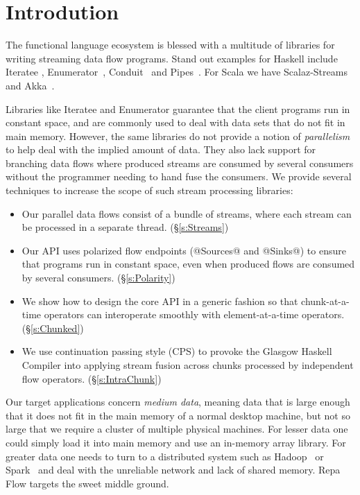 \section{Introdution}

The functional language ecosystem is blessed with a multitude of libraries for writing streaming data flow programs. Stand out examples for Haskell include Iteratee \cite{Kiselyov:iteratee}, Enumerator~\cite{hackage:enumerator}, Conduit~\cite{hackage:conduit} and Pipes~\cite{hackage:pipes}. For Scala we have Scalaz-Streams~\cite{github:scalaz-streams} and Akka~\cite{github:akka}.

Libraries like Iteratee and Enumerator guarantee that the client programs run in constant space, and are commonly used to deal with data sets that do not fit in main memory. However, the same libraries do not provide a notion of \emph{parallelism} to help deal with the implied amount of data. They also lack support for branching data flows where produced streams are consumed by several consumers without the programmer needing to hand fuse the consumers. We provide several techniques to increase the scope of such stream processing libraries:

\begin{itemize}
\item Our parallel data flows consist of a bundle of streams, where each stream can be processed in a separate thread. (\S\ref{s:Streams})

\item Our API uses polarized flow endpoints (@Sources@ and @Sinks@) to ensure that programs run in constant space, even when produced flows are consumed by several consumers. (\S\ref{s:Polarity})

\item We show how to design the core API in a generic fashion so that chunk-at-a-time operators can interoperate smoothly with element-at-a-time operators. (\S\ref{s:Chunked})

\item We use continuation passing style (CPS) to provoke the Glasgow Haskell Compiler into applying stream fusion across chunks processed by independent flow operators. (\S\ref{s:IntraChunk})
\end{itemize}

Our target applications concern \emph{medium data}, meaning data that is large enough that it does not fit in the main memory of a normal desktop machine, but not so large that we require a cluster of multiple physical machines. For lesser data one could simply load it into main memory and use an in-memory array library. For greater data one needs to turn to a distributed system such as Hadoop~\cite{Shvachko:Hadoop} or Spark~\cite{Zaharia:RDDs} and deal with the unreliable network and lack of shared memory. Repa Flow targets the sweet middle ground.

